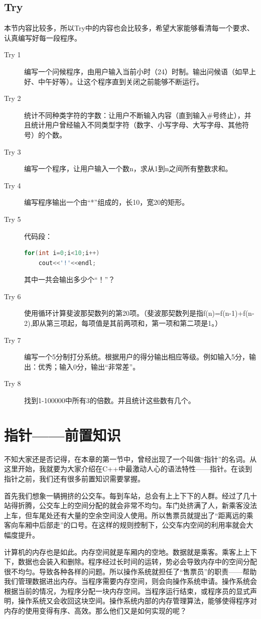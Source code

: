 \subsection{Try}
本节内容比较多，所以Try中的内容也会比较多，希望大家能够看清每一个要求、认真编写好每一段程序。
\begin{description}
	\item[Try 1]编写一个问候程序，由用户输入当前小时（24）时制。输出问候语（如早上好、中午好等）。让这个程序直到关闭之前能够不断运行。
	\item[Try 2]统计不同种类字符的字数：让用户不断输入内容（直到输入\#号终止），并且统计用户曾经输入不同类型字符（数字、小写字母、大写字母、其他符号）的个数。
	\item[Try 3]编写一个程序，让用户输入一个数n，求从1到n之间所有整数求和。
	\item[Try 4]编写程序输出一个由“*”组成的，长10，宽20的矩形。
	\item[Try 5]代码段：
		\begin{lstlisting}[language=c++,xrightmargin=20em]
for(int i=0;i<10;i++)
    cout<<'!'<<endl;
		\end{lstlisting}
		其中一共会输出多少个“！”？
	\item[Try 6]使用循环计算斐波那契数列的第20项。（斐波那契数列是指f(n)=f(n-1)+f(n-2),即从第三项起，每项值是其前两项和，第一项和第二项是1。）
	\item[Try 7]编写一个5分制打分系统。根据用户的得分输出相应等级。例如输入5分，输出：优秀；输入0分，输出“非常差”。
	\item[Try 8]找到1-100000中所有3的倍数。并且统计这些数有几个。
\end{description}

\section{指针——前置知识}
不知大家还是否记得，在本章的第一节中，曾经出现了一个叫做“指针”的名词。从这里开始，我就要为大家介绍在C++中最激动人心的语法特性——指针。在谈到指针之前，我们还有很多前置知识需要掌握。

首先我们想象一辆拥挤的公交车。每到车站，总会有上上下下的人群。经过了几十站得折腾，公交车上的空间分配的就会非常不均匀。车门处挤满了人，新乘客没法上车，但车尾处还有大量的空余空间没人使用。所以售票员就提出了“距离远的乘客向车厢中后部走”的口号。在这样的规则控制下，公交车内空间的利用率就会大幅度提升。

计算机的内存也是如此。内存空间就是车厢内的空地。数据就是乘客。乘客上上下下，数据也会装入和删除。程序经过长时间的运转，势必会导致内存中的空间分配很不均匀。导致各种各样的问题。所以操作系统就担任了“售票员”的职责——帮助我们管理数据进出内存。当程序需要内存空间，则会向操作系统申请。操作系统会根据当前的情况，为程序分配一块内存空间。当程序运行结束，或程序员的显式声明，操作系统又会收回这块空间。操作系统内部的内存管理算法，能够使得程序对内存的使用变得有序、高效。那么他们又是如何实现的呢？

